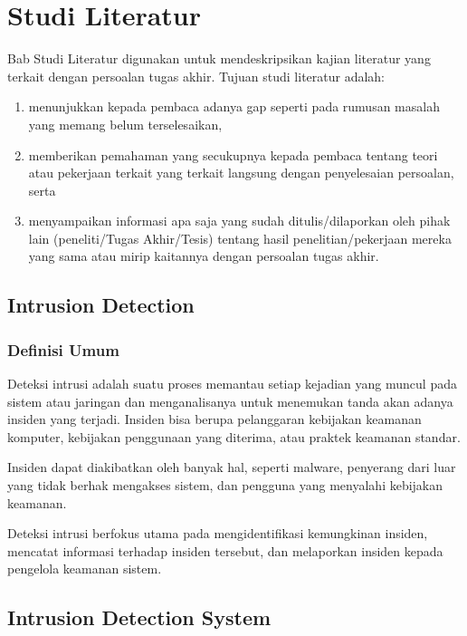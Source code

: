 \chapter{Studi Literatur}

Bab Studi Literatur digunakan untuk mendeskripsikan kajian literatur yang terkait dengan persoalan tugas akhir. Tujuan studi literatur adalah:

\begin{enumerate}
  \item menunjukkan kepada pembaca adanya gap seperti pada rumusan masalah yang memang belum terselesaikan,
  \item memberikan pemahaman yang secukupnya kepada pembaca tentang teori atau pekerjaan terkait yang terkait langsung dengan penyelesaian persoalan, serta
  \item menyampaikan informasi apa saja yang sudah ditulis/dilaporkan oleh pihak lain (peneliti/Tugas Akhir/Tesis) tentang hasil penelitian/pekerjaan mereka yang sama atau mirip kaitannya dengan persoalan tugas akhir.
\end{enumerate}

\blindtext

\blindtext

\section{Intrusion Detection}

  \subsection{Definisi Umum}

  Deteksi intrusi adalah suatu proses memantau setiap kejadian yang muncul pada sistem atau jaringan dan menganalisanya untuk menemukan tanda akan adanya insiden yang terjadi. Insiden bisa berupa pelanggaran kebijakan keamanan komputer, kebijakan penggunaan yang diterima, atau praktek keamanan standar.

  Insiden dapat diakibatkan oleh banyak hal, seperti malware, penyerang dari luar yang tidak berhak mengakses sistem, dan pengguna yang menyalahi kebijakan keamanan.

  Deteksi intrusi berfokus utama pada mengidentifikasi kemungkinan insiden, mencatat informasi terhadap insiden tersebut, dan melaporkan insiden kepada pengelola keamanan sistem.

\section{Intrusion Detection System}

